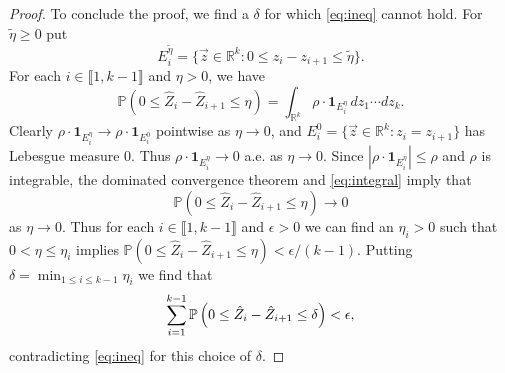 \begin{proof}
	To conclude the proof, we find a $\delta$ for which \eqref{eq:ineq} cannot hold. For $\tilde\eta\geq 0$ put
	\[
	E_i^{\tilde\eta} = \{\vec{z} \in\mathbb{R}^k : 0 \leq z_i-z_{i+1}\leq\tilde\eta\}.
	\] 
	For each $i\in\llbracket 1, k-1\rrbracket$ and $\eta > 0$, we have
	\begin{equation}\label{eq:integral}
	\mathbb{P}\left(0 \leq \hat{Z}_i - \hat{Z}_{i+1} \leq \eta\right) = \int_{\mathbb{R}^k} \rho\cdot\mathbf{1}_{E_i^\eta}\,dz_1\cdots dz_k.
	\end{equation}
	Clearly $\rho \cdot \mathbf{1}_{E_i^\eta} \to \rho \cdot \mathbf{1}_{E_i^0}$ pointwise as $\eta \to 0$, and $E_i^0 = \{\vec{z} \in\mathbb{R}^k : z_i = z_{i+1}\}$ has Lebesgue measure 0. Thus $\rho\cdot\mathbf{1}_{E_i^\eta} \to 0$ a.e. as $\eta\to 0$. Since $|\rho\cdot\mathbf{1}_{E_i^\eta}| \leq \rho$ and $\rho$ is integrable, the dominated convergence theorem \cite[Theorem 1.34]{RudinRCA} and \eqref{eq:integral} imply that
	\begin{equation*}
	\mathbb{P}\left(0 \leq \hat{Z}_i - \hat{Z}_{i+1} \leq \eta\right) \longrightarrow  0
	\end{equation*}
	as $\eta\to 0$.	Thus for each $i\in\llbracket 1,k-1\rrbracket$ and $\epsilon > 0$ we can find an $\eta_i > 0$ such that $0<\eta \leq \eta_i$ implies $\mathbb{P}(0 \leq \hat{Z}_i - \hat{Z}_{i+1} \leq \eta)<\epsilon/(k-1)$. Putting $\delta=\min_{1\leq i\leq k-1}\eta_i$ we find that 
	\begin{equation*}
	\sum_{i=1}^{k-1}\mathbb{P}\left( 0 \leq \hat Z_i-\hat Z_{i+1}\leq\delta \right) < \epsilon,
	\end{equation*}
	contradicting \eqref{eq:ineq} for this choice of $\delta$.
	
\end{proof}
